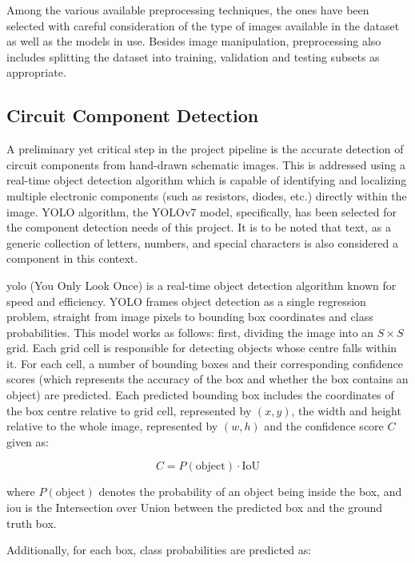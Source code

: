 Among the various available preprocessing techniques, the ones have been selected with careful consideration of the type of images available in the dataset as well as the models in use. Besides image manipulation, preprocessing also includes splitting the dataset into training, validation and testing subsets as appropriate.

\subsection{Circuit Component Detection}

A preliminary yet critical step in the project pipeline is the accurate detection of circuit components from hand-drawn schematic images. This is addressed using a real-time object detection algorithm which is capable of identifying and localizing multiple electronic components (such as resistors, diodes, etc.) directly within the image. YOLO algorithm, the YOLOv7 model, specifically, has been selected for the component detection needs of this project. It is to be noted that text, as a generic collection of letters, numbers, and special characters is also considered a component in this context.

\gls{yolo} (You Only Look Once) is a real-time object detection algorithm known for speed and efficiency. YOLO frames object detection as a single regression problem, straight from image pixels to bounding box coordinates and class probabilities. This model works as follows: first, dividing the image into an $S \times S$ grid. Each grid cell is responsible for detecting objects whose centre falls within it. For each cell, a number of bounding boxes and their corresponding confidence scores (which represents the accuracy of the box and whether the box contains an object) are predicted. Each predicted bounding box includes the coordinates of the box centre relative to grid cell, represented by $(x,y)$, the width and height relative to the whole image, represented by $(w,h)$ and the confidence score $C$ given as:

\begin{equation}
C = P(\text{object}) \cdot \text{IoU}
\label{eq:yolo-confidence-score}
\end{equation}

where $P(\text{object})$ denotes the probability of an object being inside the box, and \gls{iou} is the Intersection over Union between the predicted box and the ground truth box.

Additionally, for each box, class probabilities are predicted as:

